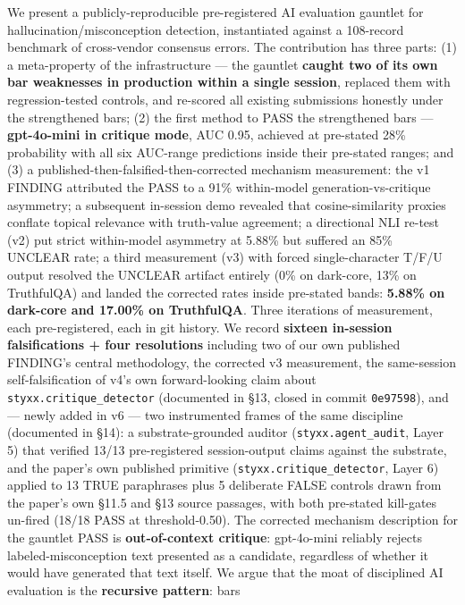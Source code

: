 \documentclass[
]{article}
\begin{document}
We present a publicly-reproducible pre-registered AI evaluation gauntlet
for hallucination/misconception detection, instantiated against a
108-record benchmark of cross-vendor consensus errors. The contribution
has three parts: (1) a meta-property of the infrastructure --- the
gauntlet \textbf{caught two of its own bar weaknesses in production
within a single session}, replaced them with regression-tested controls,
and re-scored all existing submissions honestly under the strengthened
bars; (2) the first method to PASS the strengthened bars ---
\textbf{gpt-4o-mini in critique mode}, AUC 0.95, achieved at pre-stated
28\% probability with all six AUC-range predictions inside their
pre-stated ranges; and (3) a published-then-falsified-then-corrected
mechanism measurement: the v1 FINDING attributed the PASS to a 91\%
within-model generation-vs-critique asymmetry; a subsequent in-session
demo revealed that cosine-similarity proxies conflate topical relevance
with truth-value agreement; a directional NLI re-test (v2) put strict
within-model asymmetry at 5.88\% but suffered an 85\% UNCLEAR rate; a
third measurement (v3) with forced single-character T/F/U output
resolved the UNCLEAR artifact entirely (0\% on dark-core, 13\% on
TruthfulQA) and landed the corrected rates inside pre-stated bands:
\textbf{5.88\% on dark-core and 17.00\% on TruthfulQA}. Three iterations
of measurement, each pre-registered, each in git history. We record
\textbf{sixteen in-session falsifications + four resolutions} including
two of our own published FINDING's central methodology, the corrected v3
measurement, the same-session self-falsification of v4's own
forward-looking claim about \texttt{styxx.critique\_detector}
(documented in §13, closed in commit \texttt{0e97598}), and --- newly
added in v6 --- two instrumented frames of the same discipline
(documented in §14): a substrate-grounded auditor
(\texttt{styxx.agent\_audit}, Layer 5) that verified 13/13
pre-registered session-output claims against the substrate, and the
paper's own published primitive (\texttt{styxx.critique\_detector},
Layer 6) applied to 13 TRUE paraphrases plus 5 deliberate FALSE controls
drawn from the paper's own §11.5 and §13 source passages, with both
pre-stated kill-gates un-fired (18/18 PASS at threshold-0.50). The
corrected mechanism description for the gauntlet PASS is
\textbf{out-of-context critique}: gpt-4o-mini reliably rejects
labeled-misconception text presented as a candidate, regardless of
whether it would have generated that text itself. We argue that the moat
of disciplined AI evaluation is the \textbf{recursive pattern}: bars
\end{document}

